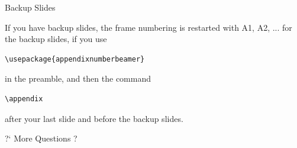 \documentclass[aspectratio=169]{beamer}
\begin{document}
\appendix
\begin{frame}[fragile]{Backup Slides}

  
  \begin{block}{}
    If you have backup slides, the frame numbering is restarted with
    A1, A2, ... for the backup slides, if you use

    
\begin{verbatim}
\usepackage{appendixnumberbeamer}
\end{verbatim}

    in the preamble, and then the command
\begin{verbatim}
\appendix
\end{verbatim}

    after your last slide and before the backup slides. 
  \end{block}

\end{frame}

\begin{frame}{}
  \centering\Huge
  ?` More Questions ?
\end{frame}

\end{document}
